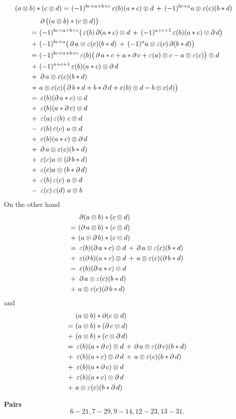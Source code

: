\documentclass{amsart}
\newcommand{\sk}[1]{\\ #1\ &}
\begin{document}
	\begin{align*}
		(a \otimes b) \ast (c \otimes d) =\ &
		(-1)^{bc+a+b+c} \operatorname{\varepsilon}(b) (a \ast c) \otimes d \,+\,
		(-1)^{bc+a} a \otimes \operatorname{\varepsilon}(c) (b \ast d)
	\end{align*}
	\begin{align}&
		\bd\big((a \ot b) \ast (c \ot d)\big) \sk{=}
		(-1)^{bc+a+b+c} \big(\aug(b) \bd (a \ast c) \ot d \,+\, (-1)^{a+c+1} \aug(b) (a \ast c) \ot \bd d\big) \sk{+}
		(-1)^{bc+a} \big(\bd a \ot \aug(c) (b \ast d) \,+\, (-1)^{a} a \ot \aug(c) \bd (b \ast d)\big) \sk{=}
		(-1)^{bc+a+b+c} \aug(b) \big(\bd a \ast c + a \ast \bd c + \aug(a) \ot c - a \ot \aug(c)\big) \ot d \sk{+}
		(-1)^{a+c+1} \aug(b) (a \ast c) \ot \bd d \sk{+}
		\bd a \ot \aug(c) (b \ast d) \sk{+}
		a \ot \aug(c) \big(\bd b \ast d + b \ast \bd d + \aug(b) \ot d - b \ot \aug(d)\big) \sk{=}
		\aug(b) (\bd a \ast c) \ot d \sk{+}
		\aug(b) (a \ast \bd c) \ot d \sk{+}
		\aug(a) \aug(b) \ c \ot d \sk{-}
		\aug(b) \aug(c) \ a \ot d \sk{+}
		\aug(b) (a \ast c) \ot \bd d \sk{+}
		\bd a \ot \aug(c) (b \ast d) \sk{+}
		\aug(c) a \ot (\bd b \ast d) \sk{+}
		\aug(c) a \ot (b \ast \bd d) \sk{+}
		\aug(b) \aug(c) \ a \ot d \sk{-}
		\aug(c) \aug(d) \ a \ot b
	\end{align}
	On the other hand
	\begin{align}&
		\bd (a \ot b) \ast (c \ot d) \sk{=}
		(\bd a \ot b) \ast (c \ot d) \sk{+}
		(a \ot \bd b) \ast (c \ot d) \sk{=}
		\aug(b) (\bd a \ast c) \ot d \,+\, \bd a \ot \aug(c) (b \ast d) \sk{+}
		\aug(\bd b) (a \ast c) \ot d \,+\, a \ot \aug(c) (\bd b \ast d) \sk{=}
		\aug(b) (\bd a \ast c) \ot d \sk{+}
		\bd a \ot \aug(c) (b \ast d) \sk{+}
		a \ot \aug(c) (\bd b \ast d)
	\end{align}
	and
	\begin{align}&
		(a \ot b) \ast \bd (c \ot d) \sk{=}
		(a \ot b) \ast (\bd c \ot d) \sk{+}
		(a \ot b) \ast (c \ot \bd d) \sk{=}
		\aug(b) (a \ast \bd c) \ot d \,+\, \bd a \ot \aug(\bd c) (b \ast d) \sk{+}
		\aug(b) (a \ast c) \ot \bd d \,+\, a \ot \aug(c) (b \ast \bd d) \sk{+}
		\aug(b) (a \ast \bd c) \ot d \sk{+}
		\aug(b) (a \ast c) \ot \bd d \sk{+}
		a \ot \aug(c) (b \ast \bd d)
	\end{align}

	\noindent\textbf{Pairs}
	\[
	6-21, 7-29, 9-14, 12-23, 13-31.
	\]
\end{document}
